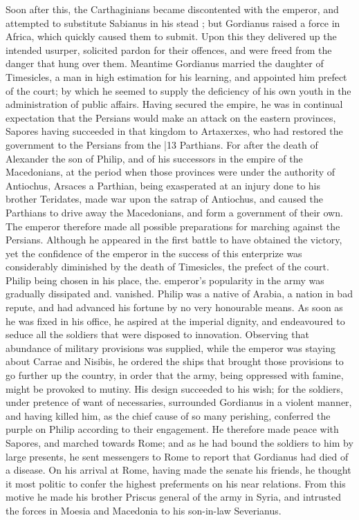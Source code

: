 Soon after this, the Carthaginians became discontented with the emperor, and attempted to substitute Sabianus in his stead ; but Gordianus raised a force in Africa, which quickly caused them to submit. Upon this they delivered up the intended usurper, solicited pardon for their offences, and were freed from the danger that hung over them. Meantime Gordianus married the daughter of Timesicles, a man in high estimation for his learning, and appointed him prefect of the court; by which he seemed to supply the deficiency of his own youth in the administration of public affairs. Having secured the empire, he was in continual expectation that the Persians would make an attack on the eastern provinces, Sapores having succeeded in that kingdom to Artaxerxes, who had restored the government to the Persians from the
|13 Parthians. For after the death of Alexander the son of Philip, and of his successors in the empire of the Macedonians, at the period when those provinces were under the authority of Antiochus, Arsaces a Parthian, being exasperated at an injury done to his brother Teridates, made war upon the satrap of Antiochus, and caused the Parthians to drive away the Macedonians, and form a government of their own. The emperor therefore made all possible preparations for marching against the Persians. Although he appeared in the first battle to have obtained the victory, yet the confidence of the emperor in the success of this enterprize was considerably diminished by the death of Timesicles, the prefect of the court. Philip being chosen in his place, the. emperor's popularity in the army was gradually dissipated and. vanished. Philip was a native of Arabia, a nation in bad repute, and had advanced his fortune by no very honourable means. As soon as he was fixed in his office, he aspired at the imperial dignity, and endeavoured to seduce all the soldiers that were disposed to innovation. Observing that abundance of military provisions was supplied, while the emperor was staying about Carrae and Nisibis, he ordered the ships that brought those provisions to go further up the country, in order that the army, being oppressed with famine, might be provoked to mutiny. His design succeeded to his wish; for the soldiers, under pretence of want of necessaries, surrounded Gordianus in a violent manner, and having killed him, as the chief cause of so many perishing, conferred the purple on Philip according to their engagement. He therefore made peace with Sapores, and marched towards Rome; and as he had bound the soldiers to him by large presents, he sent messengers to Rome to report that Gordianus had died of a disease. On his arrival at Rome, having made the senate his friends, he thought it most politic to confer the highest preferments on his near relations. From this motive he made his brother Priscus general of the army in Syria, and intrusted the forces in Moesia and Macedonia to his son-in-law Severianus.

